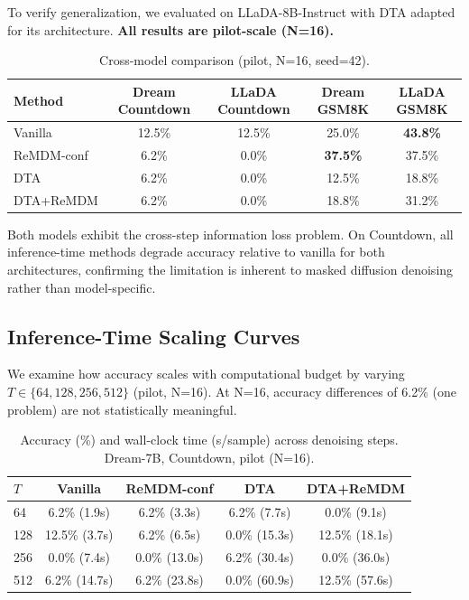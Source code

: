 \documentclass{article}
\begin{document}
To verify generalization, we evaluated on LLaDA-8B-Instruct with DTA adapted for its architecture. \textbf{All results are pilot-scale (N=16).}

\begin{table}[t]
\centering
\caption{Cross-model comparison (pilot, N=16, seed=42).}
\label{tab:crossmodel}
\small
\begin{tabular}{lcccc}
\toprule
\textbf{Method} & \textbf{Dream Countdown} & \textbf{LLaDA Countdown} & \textbf{Dream GSM8K} & \textbf{LLaDA GSM8K} \\
\midrule
Vanilla & 12.5\% & 12.5\% & 25.0\% & \textbf{43.8\%} \\
ReMDM-conf & 6.2\% & 0.0\% & \textbf{37.5\%} & 37.5\% \\
DTA & 6.2\% & 0.0\% & 12.5\% & 18.8\% \\
DTA+ReMDM & 6.2\% & 0.0\% & 18.8\% & 31.2\% \\
\bottomrule
\end{tabular}
\end{table}

Both models exhibit the cross-step information loss problem. On Countdown, all inference-time methods degrade accuracy relative to vanilla for both architectures, confirming the limitation is inherent to masked diffusion denoising rather than model-specific.

\subsection{Inference-Time Scaling Curves}
\label{sec:scaling}

We examine how accuracy scales with computational budget by varying $T \in \{64, 128, 256, 512\}$ (pilot, N=16). At N=16, accuracy differences of 6.2\% (one problem) are not statistically meaningful.

\begin{table}[t]
\centering
\caption{Accuracy (\%) and wall-clock time (s/sample) across denoising steps. Dream-7B, Countdown, pilot (N=16).}
\label{tab:scaling}
\small
\begin{tabular}{lcccc}
\toprule
$T$ & \textbf{Vanilla} & \textbf{ReMDM-conf} & \textbf{DTA} & \textbf{DTA+ReMDM} \\
\midrule
64  & 6.2\% (1.9s)  & 6.2\% (3.3s)   & 6.2\% (7.7s)   & 0.0\% (9.1s) \\
128 & 12.5\% (3.7s) & 6.2\% (6.5s)   & 0.0\% (15.3s)  & 12.5\% (18.1s) \\
256 & 0.0\% (7.4s)  & 0.0\% (13.0s)  & 6.2\% (30.4s)  & 0.0\% (36.0s) \\
512 & 6.2\% (14.7s) & 6.2\% (23.8s)  & 0.0\% (60.9s)  & 12.5\% (57.6s) \\
\bottomrule
\end{tabular}
\end{table}
\end{document}
